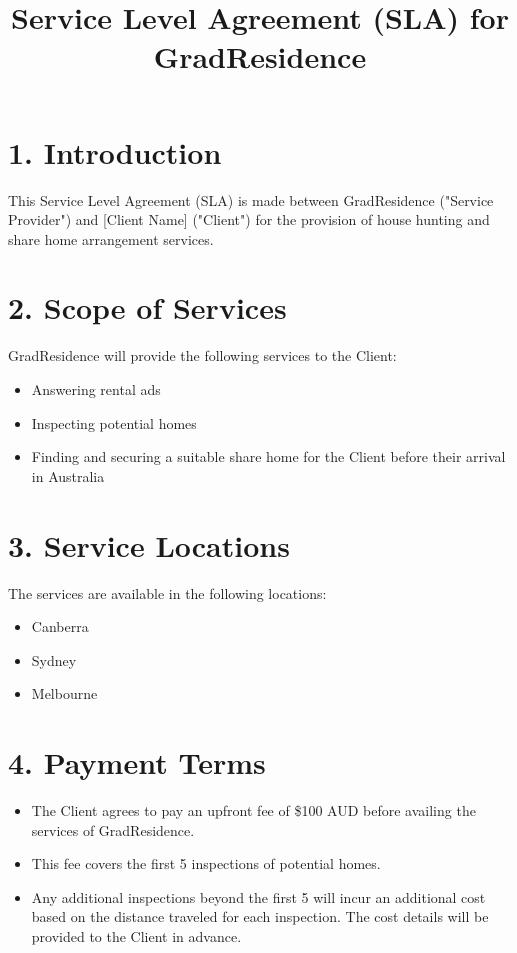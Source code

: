 \documentclass[a4paper,12pt]{article}
\title{Service Level Agreement (SLA) for GradResidence}
\date{}
\begin{document}
\maketitle

\section*{1. Introduction}
This Service Level Agreement (SLA) is made between GradResidence ("Service Provider") and [Client Name] ("Client") for the provision of house hunting and share home arrangement services.

\section*{2. Scope of Services}
GradResidence will provide the following services to the Client:
\begin{itemize}
    \item Answering rental ads
    \item Inspecting potential homes
    \item Finding and securing a suitable share home for the Client before their arrival in Australia
\end{itemize}

\section*{3. Service Locations}
The services are available in the following locations:
\begin{itemize}
    \item Canberra
    \item Sydney
    \item Melbourne
\end{itemize}

\section*{4. Payment Terms}
\begin{itemize}
    \item The Client agrees to pay an upfront fee of \$100 AUD before availing the services of GradResidence.
    \item This fee covers the first 5 inspections of potential homes.
    \item Any additional inspections beyond the first 5 will incur an additional cost based on the distance traveled for each inspection. The cost details will be provided to the Client in advance.
\end{itemize}
\end{document}
